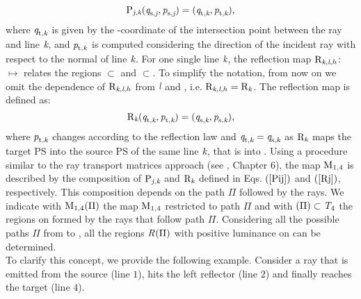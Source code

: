  \begin{equation}\label{Pij}
\mathrm{P}_{\textit{j},\textit{k}}(\textit{q}_{\textrm{s,} \textit{\textit{j}}},\textit{p}_{\textrm{s,} \textit{\textit{j}}})=(\textit{q}_{\textrm{t,} \textit{\textit{k}}},\textit{p}_{\textrm{t,} \textit{\textit{k}}}),
\end{equation}
where $\textit{q}_{\textrm{t,} \textit{\textit{k}}}$ is given by the -coordinate of the intersection point between the ray and line $\textit{k}$,
and $\textit{p}_{\textrm{t,} \textit{\textit{k}}}$ is computed considering the direction of the incident ray with respect to the normal of line $\textit{k}$. 
For one single line $\textit{k}$, the reflection map $\mathrm{R}_{\textit{k},\textit{l},h}$:~ $\mapsto$  relates the regions $\subset$ and
$\subset$. To simplify the notation, from now on we omit the dependence of $\mathrm{R}_{\textit{k},\textit{l},h}$ from $\textit{l}$ and , i.e. $\mathrm{R}_{\textit{k},\textit{l},h} = \mathrm{R}_{\textit{k}}$. The reflection map is defined as:
\begin{equation}\label{Rj}
\mathrm{R}_{\textit{k}}(\textit{q}_{\textrm{t},\textit{\textit{k}}},\textit{p}_{\textrm{t},\textit{\textit{k}}})=(\textit{q}_{\textrm{s},\textit{\textit{k}}},\textit{p}_{\textrm{s},\textit{\textit{k}}}),
\end{equation}
where $\textit{p}_{\textrm{t,} \textit{\textit{k}}}$ changes according to the reflection law and $\textit{q}_{\textrm{t,} \textit{\textit{k}}}= \textit{q}_{\textrm{s,} \textit{\textit{k}}}$ as $\mathrm{R}_{\textit{k}}$ maps the target PS into the source PS of the same line $\textit{k}$, that is  into .
Using a procedure similar to the ray transport matrices approach (see \cite{hecht1998hecht}, Chapter 6),
the map $\mathrm{M}_{1,4}$ is described by the composition of $\mathrm{P}_{\textit{j},\textit{k}}$ and $\mathrm{R}_{\textit{k}}$ defined in Eqs.
$(\ref{Pij})$ and $(\ref{Rj})$, respectively. This composition depends on the path $\Pi$ followed by the rays.
We indicate with $\mathrm{M}_{1,4}(\Pi)$
the map $\mathrm{M}_{1,4}$ restricted to path $\Pi$ and with $(\Pi)\subset \mbox{$\emph{T}_{\textit{$4$}}$}$ the regions on  formed by the rays that follow path $\Pi$.
Considering all the possible paths $\Pi$ from  to , all the regions $\mbox{$\emph{R}_{\textit{}}$}(\Pi)$ with positive luminance on  can be determined.
\\ \indent To clarify this concept, we provide the following example.
Consider a ray that is emitted from the source (line $1$), hits the left reflector (line $2$) and finally reaches the target (line $4$).
